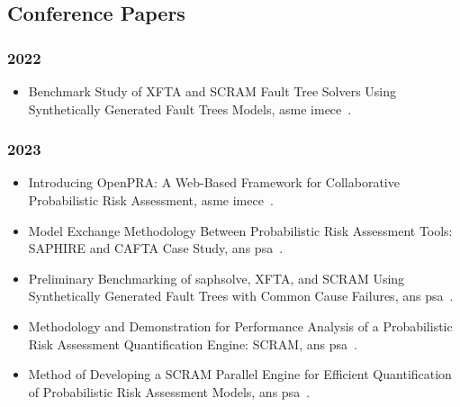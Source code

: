 \subsection{Conference Papers}
\subsubsection*{2022}
\begin{itemize}
    \item {Benchmark Study of XFTA and SCRAM Fault Tree Solvers Using Synthetically Generated Fault Trees Models, \acrfull{asme} \acrfull{imece}~\cite{aras_benchmark_2022}}.
\end{itemize}

\subsubsection*{2023}
\begin{itemize}
    \item {Introducing OpenPRA: A Web-Based Framework for Collaborative Probabilistic Risk Assessment}, \acrshort{asme} \acrshort{imece}~\cite{earthperson_introducing_2023}.
    \item {Model Exchange Methodology Between Probabilistic Risk Assessment Tools: SAPHIRE and CAFTA Case Study}, \acrfull{ans} \acrfull{psa}~\cite{hamza_model_2023}.
    \item {Preliminary Benchmarking of \acrshort{saphsolve}, XFTA, and SCRAM Using Synthetically Generated Fault Trees with Common Cause Failures}, \acrshort{ans} \acrshort{psa}~\cite{farag_preliminary_2023}.
    \item {Methodology and Demonstration for Performance Analysis of a Probabilistic Risk Assessment Quantification Engine: SCRAM}, \acrshort{ans} \acrshort{psa}~\cite{aras_methodology_2023}.
    \item {Method of Developing a SCRAM Parallel Engine for Efficient Quantification of Probabilistic Risk Assessment Models}, \acrshort{ans} \acrshort{psa}~\cite{aras_method_2023}.
\end{itemize}

